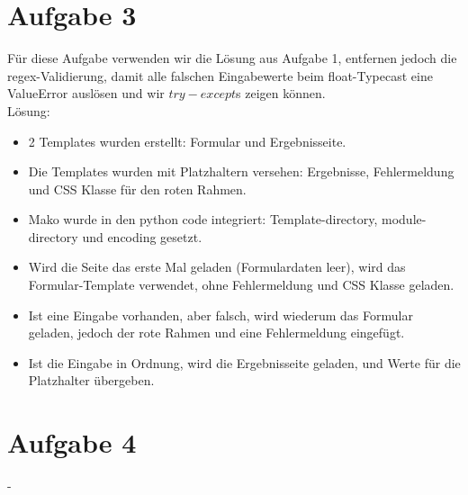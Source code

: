 \documentclass[12pt, a4paper]{report}
\begin{document}
\section*{Aufgabe 3}
Für diese Aufgabe verwenden wir die Lösung aus Aufgabe 1, entfernen jedoch die regex-Validierung, damit alle falschen Eingabewerte beim float-Typecast eine ValueError auslösen und wir $try-except$s zeigen können.\\
Lösung:
\begin{itemize}
	\item 2 Templates wurden erstellt: Formular und Ergebnisseite.
	\item Die Templates wurden mit Platzhaltern versehen: Ergebnisse, Fehlermeldung und CSS Klasse für den roten Rahmen.
	\item Mako wurde in den python code integriert: Template-directory, module-directory und encoding gesetzt.
	\item Wird die Seite das erste Mal geladen (Formulardaten leer), wird das Formular-Template verwendet, ohne Fehlermeldung und CSS Klasse geladen.
	\item Ist eine Eingabe vorhanden, aber falsch, wird wiederum das Formular geladen, jedoch der rote Rahmen und eine Fehlermeldung eingefügt.
	\item Ist die Eingabe in Ordnung, wird die Ergebnisseite geladen, und Werte für die Platzhalter übergeben.
\end{itemize}



\section*{Aufgabe 4}
-
\end{document}
